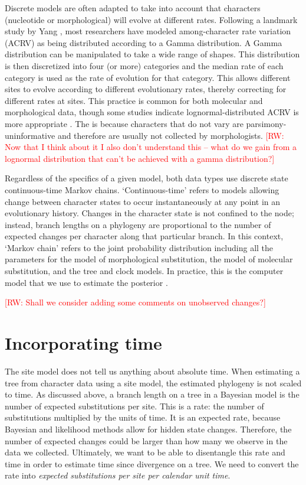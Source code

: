 \documentclass[11pt]{article}
\newcommand{\rw}[1]{{\textcolor{red}{[RW: #1]}}} %
\begin{document}
Discrete models are often adapted to take into account that characters (nucleotide or morphological) will evolve at different rates. Following a landmark study by Yang \cite{Yang1994a}, most researchers have modeled among-character rate variation (ACRV) as being distributed according to a Gamma distribution.
A Gamma distribution can be manipulated to take a wide range of shapes.
This distribution is then discretized into four (or more) categories and the median rate of each category is used as the rate of evolution for that category.
This allows different sites to evolve according to different evolutionary rates, thereby correcting for different rates at sites.
This practice is common for both molecular and morphological data, though some studies indicate lognormal-distributed ACRV is more appropriate \cite{wagner2011, Harrison2015}. The is because characters that do not vary are parsimony-uninformative and therefore are usually not collected by morphologists. \rw{Now that I think about it I also don't understand this -- what do we gain from a lognormal distribution that can't be achieved with a gamma distribution?}

Regardless of the specifics of a given model, both data types use discrete state continuous-time Markov chains.
`Continuous-time' refers to models allowing change between character states to occur instantaneously at any point in an evolutionary history.
Changes in the character state is not confined to the node; instead, branch lengths on a phylogeny are proportional to the number of expected changes per character along that particular branch. 
In this context, `Markov chain' refers to the  joint probability distribution including all the parameters for the model of morphological substitution, the model of molecular substitution, and the tree and clock models. 
In practice, this is the computer model that we use to estimate the posterior \cite{Hoehna2016b}.

\rw{Shall we consider adding some comments on unobserved changes?}

\section{Incorporating time} %

The site model does not tell us anything about absolute time.
When estimating a tree from character data using a site model, the estimated phylogeny is not scaled to time.
As discussed above, a branch length on a tree in a Bayesian model is the number of expected substitutions per site.
This is a rate: the number of substitutions multiplied by the units of time.
It is an expected rate, because Bayesian and likelihood methods allow for hidden state changes.
Therefore, the number of expected changes could be larger than how many we observe in the data we collected.
Ultimately, we want to be able to disentangle this rate and time in order to estimate time since divergence on a tree.
We need to convert the rate into \textit{expected substitutions per site per calendar unit time}.
\end{document}
